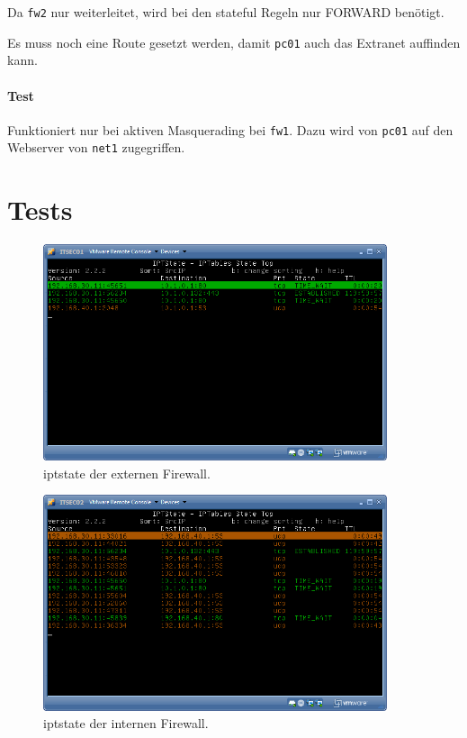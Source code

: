 Da {\tt fw2} nur weiterleitet, wird bei den stateful
Regeln nur FORWARD benötigt.

Es muss noch eine Route gesetzt werden, damit {\tt pc01} auch das Extranet
auffinden kann.

\paragraph{Test} Funktioniert nur bei aktiven Masquerading bei {\tt fw1}.
Dazu wird von {\tt pc01} auf den Webserver von {\tt net1} zugegriffen.


\section{Tests}\label{sec.tests}

\begin{figure}[h!]
  \centering
    \includegraphics[width=0.9\textwidth]{figures/iptstate-extern.png}
  \caption{iptstate der externen Firewall.}
  \label{fig.iptstate-extern}
\end{figure}

\begin{figure}[h!]
  \centering
    \includegraphics[width=0.9\textwidth]{figures/iptstate-intern.png}
  \caption{iptstate der internen Firewall.}
  \label{fig.iptstate-intern}
\end{figure}


